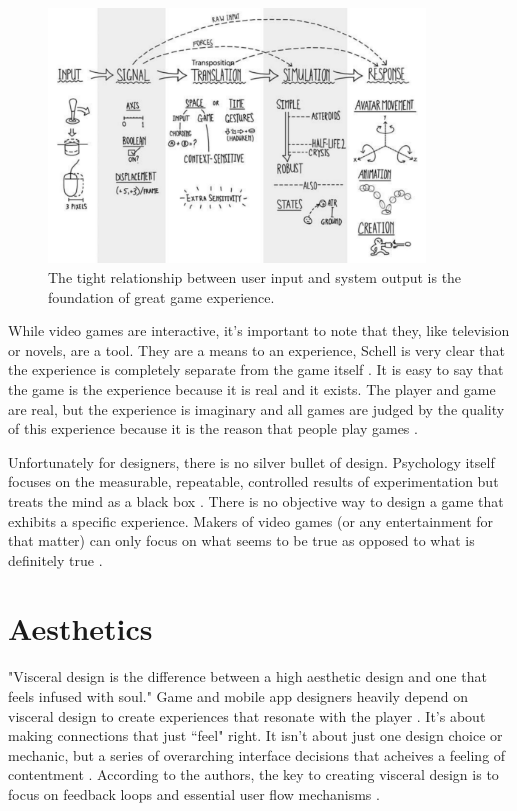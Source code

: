 \begin{figure}
\centering
\includegraphics[width=100mm]{images/relationships.pdf}
\caption[Input and output]{The tight relationship between user input and system output is the foundation of great game experience.}
\label{fig:relationships}
\end{figure}

While video games are interactive, it's important to note that they, like television or novels, are a tool. They are a means to an experience, Schell is very clear that the experience is completely separate from the game itself \cite{schell2008art}. It is easy to say that the game is the experience because it is real and it exists. The player and game are real, but the experience is imaginary and all games are judged by the quality of this experience because it is the reason that people play games \cite{schell2008art}.

Unfortunately for designers, there is no silver bullet of design. Psychology itself focuses on the measurable, repeatable, controlled results of experimentation but treats the mind as a black box \cite{schell2008art}. There is no objective way to design a game that exhibits a specific experience. Makers of video games (or any entertainment for that matter) can only focus on what seems to be true as opposed to what is definitely true \cite{schell2008art}.

\section{Aesthetics}

"Visceral design is the difference between a high aesthetic design and one that feels infused with soul." \cite{brown2013how} Game and mobile app designers heavily depend on visceral design to create experiences that resonate with the player \cite{brown2013how}. It's about making connections that just ``feel" right. It isn't about just one design choice or mechanic, but a series of overarching interface decisions that acheives a feeling of contentment \cite{brown2013how}. According to the authors, the key to creating visceral design is to focus on feedback loops and essential user flow mechanisms \cite{brown2013how}.

